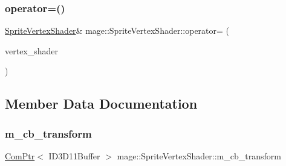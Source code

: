 \subsubsection{\texorpdfstring{operator=()}{operator=()}\hspace{0.1cm}{\footnotesize\ttfamily [2/2]}}
{\footnotesize\ttfamily \hyperlink{classmage_1_1_sprite_vertex_shader}{Sprite\+Vertex\+Shader}\& mage\+::\+Sprite\+Vertex\+Shader\+::operator= (\begin{DoxyParamCaption}\item[{\hyperlink{classmage_1_1_sprite_vertex_shader}{Sprite\+Vertex\+Shader} \&\&}]{vertex\+\_\+shader }\end{DoxyParamCaption})\hspace{0.3cm}{\ttfamily [delete]}}



\subsection{Member Data Documentation}
\hypertarget{classmage_1_1_sprite_vertex_shader_a8d8f7c137da98c64d79d277400750637}{}\label{classmage_1_1_sprite_vertex_shader_a8d8f7c137da98c64d79d277400750637} 
\subsubsection{\texorpdfstring{m\+\_\+cb\+\_\+transform}{m\_cb\_transform}}
{\footnotesize\ttfamily \hyperlink{namespacemage_ae74f374780900893caa5555d1031fd79}{Com\+Ptr}$<$ I\+D3\+D11\+Buffer $>$ mage\+::\+Sprite\+Vertex\+Shader\+::m\+\_\+cb\+\_\+transform\hspace{0.3cm}{\ttfamily [private]}}

